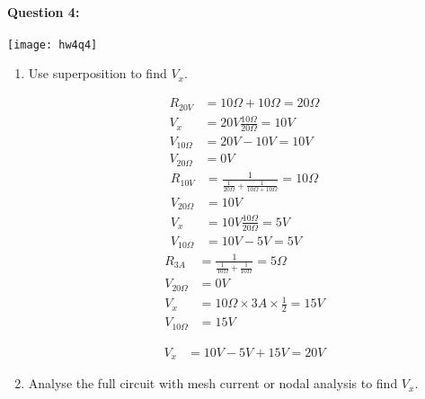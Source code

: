 \documentclass[12pt,letterpaper,titlepage]{article}
\begin{document}
\begin{raggedright}
\clearpage

\paragraph{Question 4: }

\begin{center}
\texttt{[image: hw4q4]}
\end{center}

\begin{enumerate}[label=\Alph*)]
\item Use superposition to find $V_x$.
\begin{paracol}{3}
\begin{align*}
    R_{20V}      &= 10\Omega  + 10\Omega = 20\Omega
\\  V_{x}        &= 20V \frac{10\Omega}{20\Omega} = 10V
\\  V_{10\Omega} &= 20V - 10V = 10V
\\  V_{20\Omega} &= 0V
\end{align*}
\switchcolumn
\begin{align*}
    R_{10V}      &= \frac{1}{\frac{1}{20\Omega} + \frac{1}{10\Omega + 10\Omega}} = 10\Omega
\\  V_{20\Omega} &= 10V
\\  V_{x}        &= 10V \frac{10\Omega}{20\Omega} = 5V
\\  V_{10\Omega} &= 10V - 5V = 5V
\end{align*}
\switchcolumn
\begin{align*}
    R_{3A}       &= \frac{1}{\frac{1}{10\Omega} + \frac{1}{10\Omega}} = 5\Omega
\\  V_{20\Omega} &= 0V
\\  V_{x}        &= 10\Omega\times3A\times\frac{1}{2} = 15V
\\  V_{10\Omega} &= 15V
\end{align*}
\end{paracol}
\begin{align*}
V_{x} &= 10V - 5V + 15V = 20V
\end{align*}
\item Analyse the full circuit with mesh current or nodal analysis to find $V_x$.



\end{enumerate}

\end{raggedright}
\end{document}
